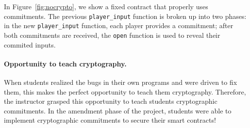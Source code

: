 \documentclass[10pt,twocolumn,letterpaper]{article}
\newcommand{\elaine}[1]{}
\newcommand{\ignore}[1]{}
\begin{document}
In Figure~\ref{fig:nocrypto}, we show a fixed contract that properly uses commitments. The previous \texttt{player\_input} function is broken up into two phases: in the new \texttt{player\_input} function, each player provides a commitment; after both commitments are received, the \texttt{open} function is used to reveal their commited inputs.

\paragraph{Opportunity to teach cryptography.}
When students realized the bugs 
in their own programs and were driven to fix them, 
this makes the perfect
opportunity to  
teach them cryptography.
Therefore, the instructor
grasped this opportunity to teach students cryptographic commitments. 
In the amendment phase of the project,
students were able to implement cryptographic commitments
to secure their smart contracts!




\ignore{
Cryptography is often the first line of defense against security hazards in smart contract programming. In the example above, players reveal too much plaintext information, which can be used by an attacker to spoil the game. In the section, we'll describe how to apply cryptographic commitments to fix this problem.

In our RPS contract the user is using a numeric scale as their input with 0: rock, 1: paper, 2: scissors. Let's take a look at the function that registers their inputs and think about possible vulnerabilities:
}


\elaine{in figures, can we put in framed boxes the lines
that have problems.}
\end{document}
